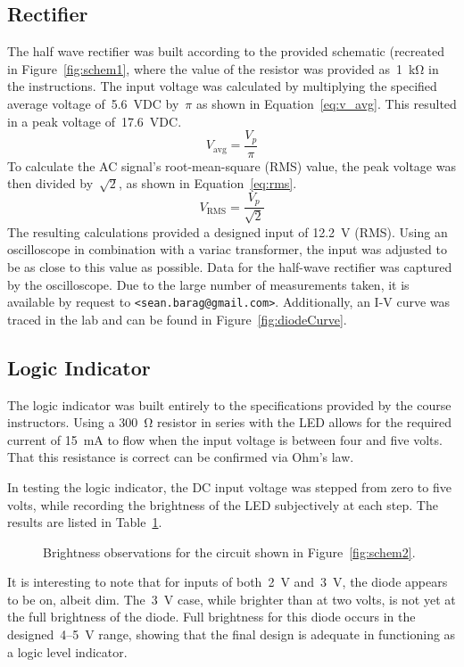 \subsection{Rectifier}
The half wave rectifier was built according to the provided schematic (recreated
in Figure~\ref{fig:schem1}, where the value of the resistor was provided
as~\SI{1}{\kilo\ohm} in the instructions.  The input voltage was calculated by
multiplying the specified average voltage of~\SI{5.6}{\volt}DC by~$\pi$ as
shown in Equation~\ref{eq:v_avg}.  This resulted in a peak voltage
of~\SI{17.6}{\volt}DC.
%
\begin{equation}
	V_\text{avg} = \frac{V_p}{\pi}
	\label{eq:v_avg}
\end{equation}
%
To calculate the AC signal's root-mean-square (RMS) value, the peak voltage was
then divided by~$\sqrt{2}$, as shown in Equation~\ref{eq:rms}.
%
\begin{equation}
	V_\text{RMS} = \frac{V_p}{\sqrt{2}}
	\label{eq:rms}
\end{equation}
%
The resulting calculations provided a designed input of \SI{12.2}{\volt} (RMS).
Using an oscilloscope in combination with a variac transformer, the input was
adjusted to be as close to this value as possible. Data for the half-wave
rectifier was captured by the oscilloscope.  Due to the large number of
measurements taken, it is available by request to
\texttt{<sean.barag@gmail.com>}.  Additionally, an I-V curve was traced in the
lab and can be found in Figure~\ref{fig:diodeCurve}.

\subsection{Logic Indicator}
The logic indicator was built entirely to the specifications provided by the
course instructors.  Using a \SI{300}{\ohm} resistor in series with the LED
allows for the required current of \SI{15}{\milli\ampere} to flow when the
input voltage is between four and five volts.  That this resistance is correct
can be confirmed via Ohm's law.

In testing the logic indicator, the DC input voltage was stepped from zero to
five volts, while recording the brightness of the LED subjectively at each
step.  The results are listed in Table~\ref{tab:ckt2data}.
%
\begin{figure}[H]
	\centering
	
	\caption{Brightness observations for the circuit shown in
		Figure~\ref{fig:schem2}.}
	\label{tab:ckt2data}
\end{figure}
%
It is interesting to note that for inputs of both~\SI{2}{\volt}
and~\SI{3}{\volt}, the diode appears to be on, albeit dim.  The~\SI{3}{\volt}
case, while brighter than at two volts, is not yet at the full brightness of
the diode.  Full brightness for this diode occurs in the
designed~4--\SI{5}{\volt} range, showing that the final design is adequate in
functioning as a logic level indicator.

